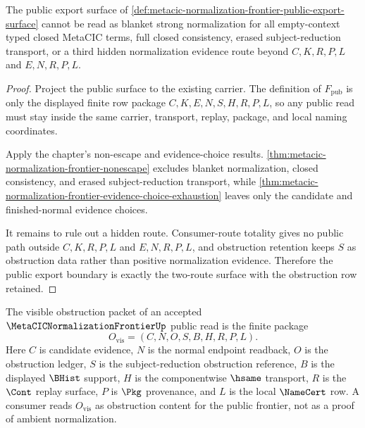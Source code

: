 \begin{theorem}
\label{thm:metacic-normalization-frontier-public-export-nonescape}
The public export surface of
\autoref{def:metacic-normalization-frontier-public-export-surface} cannot be
read as blanket strong normalization for all empty-context typed closed
MetaCIC terms, full closed consistency, erased subject-reduction transport, or
a third hidden normalization evidence route beyond $C,K,R,P,L$ and
$E,N,R,P,L$.
\end{theorem}
\begin{proof}
Project the public surface to the existing carrier. The definition of
$F_{\mathrm{pub}}$ is only the displayed finite row package
$C,K,E,N,S,H,R,P,L$, so any public read must stay inside the same carrier,
transport, replay, package, and local naming coordinates.

Apply the chapter's non-escape and evidence-choice results.
\autoref{thm:metacic-normalization-frontier-nonescape} excludes blanket
normalization, closed consistency, and erased subject-reduction transport,
while \autoref{thm:metacic-normalization-frontier-evidence-choice-exhaustion}
leaves only the candidate and finished-normal evidence choices.

It remains to rule out a hidden route. Consumer-route totality gives no
public path outside $C,K,R,P,L$ and $E,N,R,P,L$, and obstruction retention
keeps $S$ as obstruction data rather than positive normalization evidence.
Therefore the public export boundary is exactly the two-route surface with
the obstruction row retained.
\end{proof}

\begin{definition}
\label{def:metacic-normalization-frontier-visible-obstruction-packet}
The visible obstruction packet of an accepted
$\MetaCICNormalizationFrontierUp$ public read is the finite package
$$
O_{\mathrm{vis}}=(C,N,O,S,B,H,R,P,L).
$$
Here $C$ is candidate evidence, $N$ is the normal endpoint readback, $O$ is the
obstruction ledger, $S$ is the subject-reduction obstruction reference, $B$ is
the displayed $\BHist$ support, $H$ is the componentwise $\hsame$ transport,
$R$ is the $\Cont$ replay surface, $P$ is $\Pkg$ provenance, and $L$ is the
local $\NameCert$ row. A consumer reads $O_{\mathrm{vis}}$ as obstruction
content for the public frontier, not as a proof of ambient normalization.
\end{definition}

